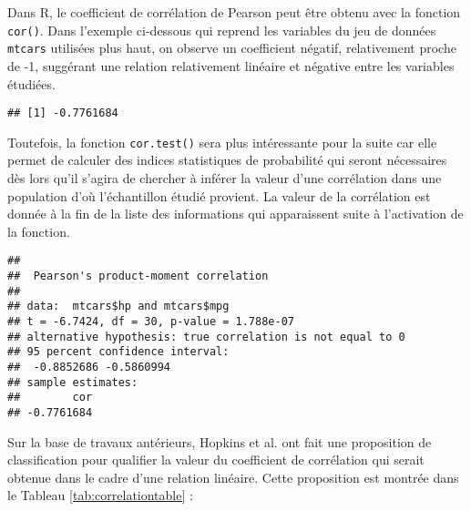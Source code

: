 \documentclass[
]{book}
\newenvironment{Shaded}{\begin{snugshade}}{\end{snugshade}}
\newcommand{\AttributeTok}[1]{\textcolor[rgb]{0.77,0.63,0.00}{#1}}
\newcommand{\FunctionTok}[1]{\textcolor[rgb]{0.00,0.00,0.00}{#1}}
\newcommand{\NormalTok}[1]{#1}
\newcommand{\SpecialCharTok}[1]{\textcolor[rgb]{0.00,0.00,0.00}{#1}}
\newcommand{\StringTok}[1]{\textcolor[rgb]{0.31,0.60,0.02}{#1}}
\begin{document}
Dans R, le coefficient de corrélation de Pearson peut être obtenu avec la fonction \texttt{cor()}. Dans l'exemple ci-dessous qui reprend les variables du jeu de données \texttt{mtcars} utilisées plus haut, on observe un coefficient négatif, relativement proche de -1, suggérant une relation relativement linéaire et négative entre les variables étudiées.

\begin{Shaded}
\end{Shaded}

\begin{verbatim}
## [1] -0.7761684
\end{verbatim}

Toutefois, la fonction \texttt{cor.test()} sera plus intéressante pour la suite car elle permet de calculer des indices statistiques de probabilité qui seront nécessaires dès lors qu'il s'agira de chercher à inférer la valeur d'une corrélation dans une population d'où l'échantillon étudié provient. La valeur de la corrélation est donnée à la fin de la liste des informations qui apparaissent suite à l'activation de la fonction.

\begin{Shaded}
\end{Shaded}

\begin{verbatim}
## 
##  Pearson's product-moment correlation
## 
## data:  mtcars$hp and mtcars$mpg
## t = -6.7424, df = 30, p-value = 1.788e-07
## alternative hypothesis: true correlation is not equal to 0
## 95 percent confidence interval:
##  -0.8852686 -0.5860994
## sample estimates:
##        cor 
## -0.7761684
\end{verbatim}

Sur la base de travaux antérieurs, Hopkins et al. \autocite*{hopkinsProgressiveStatisticsStudies2009} ont fait une proposition de classification pour qualifier la valeur du coefficient de corrélation qui serait obtenue dans le cadre d'une relation linéaire. Cette proposition est montrée dans le Tableau \ref{tab:correlationtable} :
\end{document}
